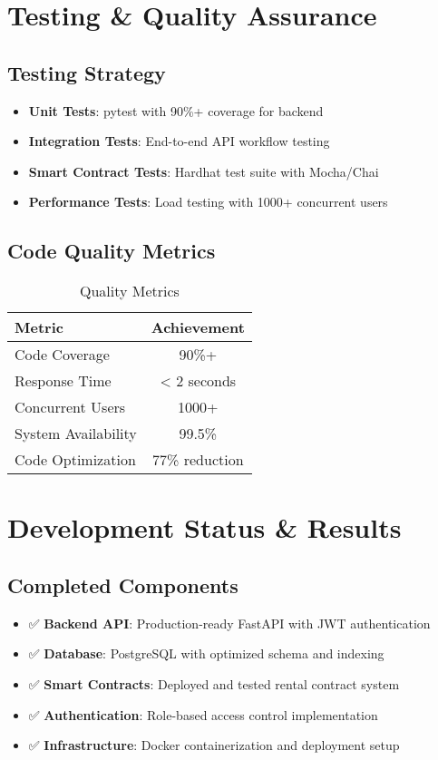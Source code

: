 \documentclass[11pt,a4paper]{article}
\begin{document}
\section{Testing \& Quality Assurance}

\subsection{Testing Strategy}
\begin{itemize}
    \item \textbf{Unit Tests}: pytest with 90\%+ coverage for backend
    \item \textbf{Integration Tests}: End-to-end API workflow testing
    \item \textbf{Smart Contract Tests}: Hardhat test suite with Mocha/Chai
    \item \textbf{Performance Tests}: Load testing with 1000+ concurrent users
\end{itemize}

\subsection{Code Quality Metrics}
\begin{table}[H]
\centering
\begin{tabular}{|l|c|}
\hline
\textbf{Metric} & \textbf{Achievement} \\
\hline
Code Coverage & 90\%+ \\
Response Time & < 2 seconds \\
Concurrent Users & 1000+ \\
System Availability & 99.5\% \\
Code Optimization & 77\% reduction \\
\hline
\end{tabular}
\caption{Quality Metrics}
\end{table}

\section{Development Status \& Results}

\subsection{Completed Components}
\begin{itemize}
    \item ✅ \textbf{Backend API}: Production-ready FastAPI with JWT authentication
    \item ✅ \textbf{Database}: PostgreSQL with optimized schema and indexing
    \item ✅ \textbf{Smart Contracts}: Deployed and tested rental contract system
    \item ✅ \textbf{Authentication}: Role-based access control implementation
    \item ✅ \textbf{Infrastructure}: Docker containerization and deployment setup
\end{itemize}
\end{document}
